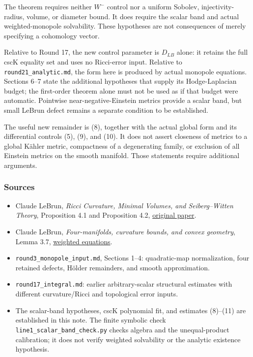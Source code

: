 \documentclass[
  11pt,
]{article}
\providecommand{\tightlist}{%
  \setlength{\itemsep}{0pt}\setlength{\parskip}{0pt}}
\begin{document}
The theorem requires neither \(W^-\) control nor a uniform Sobolev,
injectivity-radius, volume, or diameter bound. It does require the
scalar band and actual weighted-monopole solvability. These hypotheses
are not consequences of merely specifying a cohomology vector.

Relative to Round 17, the new control parameter is \(D_{LB}\) alone: it
retains the full cscK equality set and uses no Ricci-error input.
Relative to \texttt{round21\_analytic.md}, the form here is produced by
actual monopole equations. Sections 6--7 state the additional hypotheses
that supply its Hodge-Laplacian budget; the first-order theorem alone
must not be used as if that budget were automatic. Pointwise
near-negative-Einstein metrics provide a scalar band, but small LeBrun
defect remains a separate condition to be established.

The useful new remainder is (8), together with the actual global form
and its differential controls (5), (9), and (10). It does not assert
closeness of metrics to a global Kähler metric, compactness of a
degenerating family, or exclusion of all Einstein metrics on the smooth
manifold. Those statements require additional arguments.

\hypertarget{sources}{%
\subsubsection{Sources}\label{sources}}

\begin{itemize}
\tightlist
\item
  Claude LeBrun, \emph{Ricci Curvature, Minimal Volumes, and
  Seiberg--Witten Theory}, Proposition 4.1 and Proposition 4.2,
  \href{https://arxiv.org/abs/math/0003068}{original paper}.
\item
  Claude LeBrun, \emph{Four-manifolds, curvature bounds, and convex
  geometry}, Lemma 3.7,
  \href{https://arxiv.org/abs/math/0611450}{weighted equations}.
\item
  \texttt{round3\_monopole\_input.md}, Sections 1--4: quadratic-map
  normalization, four retained defects, Hölder remainders, and smooth
  approximation.
\item
  \texttt{round17\_integral.md}: earlier arbitrary-scalar structural
  estimates with different curvature/Ricci and topological error inputs.
\item
  The scalar-band hypotheses, cscK polynomial fit, and estimates
  (8)--(11) are established in this note. The finite symbolic check
  \texttt{line1\_scalar\_band\_check.py} checks algebra and the
  unequal-product calibration; it does not verify weighted solvability
  or the analytic existence hypothesis.
\end{itemize}
\end{document}
